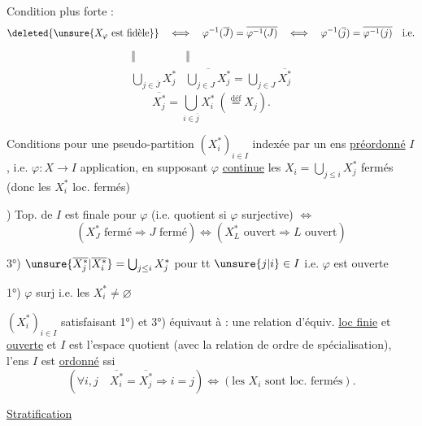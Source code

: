 
Condition plus forte : 
\[
\deleted{\unsure{X_\varphi\text{ est fidèle}}}\quad\Longleftrightarrow\quad
\varphi^{-1}(\overline J)=\overline{\varphi^{-1}(J)}
\quad\Longleftrightarrow\quad
\varphi^{-1}(\overline j)=\overline{\varphi^{-1}(j)}\quad\text{i.e.}
\]
\[
\begin{array}{cc}
\Vert&\Vert\\
\displaystyle\bigcup_{j\in\overline J}X_j^*&
\displaystyle\overline{\bigcup_{j\in J}X_j^*}=\bigcup_{j\in J}\overline{X_j^*}
\end{array}
\]
\[
\overline{X_j^*}=\bigcup_{i\in\overline j}X_i^*\ (\overset{\mathrm{déf}}=X_j).
\]

Conditions pour une pseudo-partition $(X_i^*)_{i\in I}$  indexée par un ens
\uline{préordonné} $I$, i.e. $\varphi:X\longrightarrow I$ application, en supposant $\varphi$ \uline{continue}
 les $X_i=\bigcup_{j\leq i}X_j^*$ fermés (donc les $X_i^*$ loc. fermés)

) Top. de $I$ est finale pour $\varphi$ (i.e. quotient si $\varphi$ surjective) $\Longleftrightarrow$
\[
(X_J^*\text{ fermé}\Rightarrow J\text{ fermé})\Longleftrightarrow
(X_L^*\text{ ouvert}\Rightarrow L\text{ ouvert})
\]

3°) $\unsure{\overline{X_j^*}|\overline{X_i^*}}=\bigcup_{j\leq i}X_j^*$ pour tt $\unsure{j|i}\in I$ i.e. $\varphi$ est ouverte

1°) $\varphi$ surj i.e. les $X_i^*\ne\varnothing$


 $(X_i^*)_{i\in I}$ satisfaisant 1°) et 3°) équivaut à
 : une relation d'équiv. \uline{loc finie} et \uline{ouverte}
et $I$ est l'espace quotient (avec la relation de ordre
de spécialisation),  l'ens $I$ est \uline{ordonné} ssi
\[
(\forall i,j\quad\overline{X_i^*}=\overline{X_j^*}\Rightarrow i=j)
\Longleftrightarrow(\text{les }X_i\text{ sont loc. fermés}).
\]

\uline{Stratification} \uline{}

